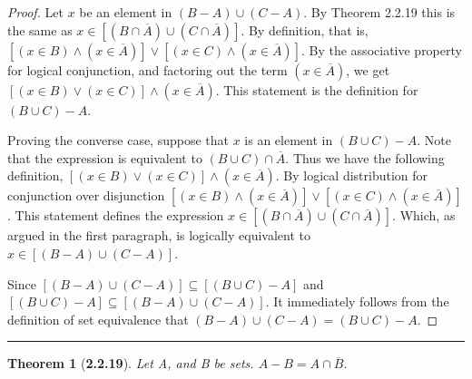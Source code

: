 \documentclass[a4paper, 12pt]{article}
\theoremstyle{plain}
\newtheorem*{theorem*}{Theorem}
\begin{document}
\begin{proof}
    Let $x$ be an element in $(B - A) \cup (C - A)$. By Theorem 2.2.19 this is the same as  
    $x \in [(B \cap \overline{A}) \cup (C \cap \overline{A})]$. By definition, that is, 
    \newline 
    $[(x \in B) \land (x \in \overline{A})] \lor [(x \in C) \land (x \in \overline{A})]$. By 
    the associative property for logical conjunction, and factoring out the term 
    $(x \in \overline{A})$, we get \newline 
    $[(x \in B) \lor (x \in C)] \land (x \in \overline{A})$. This statement is the definition 
    for \newline $(B \cup C) - A$.
    
    Proving the converse case, suppose that $x$ is an element in $(B \cup C) - A$. Note that 
    the expression is equivalent to $(B \cup C) \cap \overline{A}$. Thus we have the following 
    definition, $[(x \in B) \lor (x \in C)] \land (x \in \overline{A})$. By logical distribution 
    for conjunction over disjunction 
    $[(x \in B) \land (x \in \overline{A})] \lor [(x \in C) \land (x \in \overline{A})]$. This 
    statement defines the expression $x \in [(B \cap \overline{A}) \cup (C \cap \overline{A})]$. 
    Which, as argued in the first paragraph, is logically equivalent to 
    $x \in [(B - A) \cup (C - A)]$.
    
    Since $[(B - A) \cup (C - A)] \subseteq [(B \cup C) - A]$ and \newline 
    $[(B \cup C) - A] \subseteq [(B - A) \cup (C - A)]$. It immediately follows from the definition 
    of set equivalence that $(B - A) \cup (C - A) = (B \cup C) - A$.
\end{proof}
\begin{center}
    \rule{5.4in}{1pt}
\end{center}


\begin{theorem*}[\textbf{2.2.19}]
    Let A, and B be sets. $A - B = A \cap \overline{B}$.
\end{theorem*}
\end{document}
